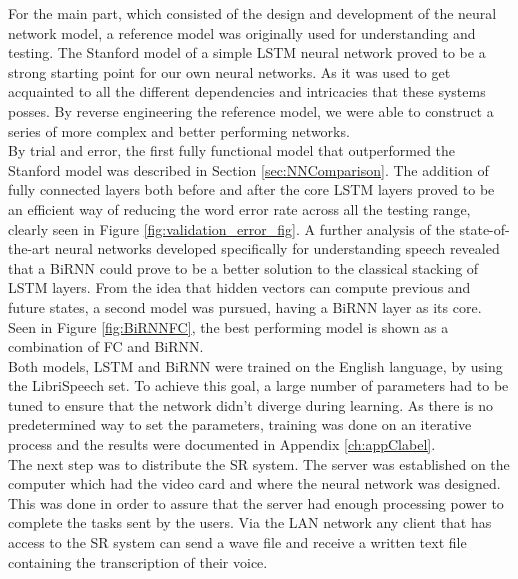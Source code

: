    For the main part, which consisted of the design and development of the neural network model, a reference model was originally used for understanding and testing. The Stanford model of a simple LSTM neural network proved to be a strong starting point for our own neural networks. As it was used to get acquainted to all the different dependencies and intricacies that these systems posses. By reverse engineering the reference model, we were able to construct a series of more complex and better performing networks.\\
    
   By trial and error, the first fully functional model that outperformed the Stanford model was described in Section \ref{sec:NNComparison}. The addition of fully connected layers both before and after the core LSTM layers proved to be an efficient way of reducing the word error rate across all the testing range, clearly seen in Figure \ref{fig:validation_error_fig}. A further analysis of the state-of-the-art neural networks developed specifically for understanding speech revealed that a BiRNN could prove to be a better solution to the classical stacking of LSTM layers. From the idea that hidden vectors can compute previous and future states, a second model was pursued, having a BiRNN layer as its core. Seen in Figure \ref{fig:BiRNNFC}, the best performing model is shown as a combination of FC and BiRNN. \\
   
Both models, LSTM and BiRNN were trained on the English language, by using the LibriSpeech set. To achieve this goal, a large number of parameters had to be tuned to ensure that the network didn't diverge during learning. As there is no predetermined way to set the parameters, training was done on an iterative process and the results were documented in Appendix \ref{ch:appClabel}.\\

The next step was to distribute the SR system. The server was established on the computer which had the video card and where the neural network was designed. This was done in order to assure that the server had enough processing power to complete the tasks sent by the users. Via the LAN network any client that has access to the SR system can send a wave file and receive a written text file containing the transcription of their voice. \\

